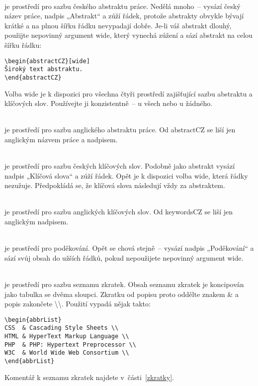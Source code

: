 \documentclass[fonts,numbering,twoside,margins]{./tulpackage/tulthesis}
\newcommand{\argument}[1]{{\ttfamily\color{\tulcolor}#1}}
\newcommand{\argumentindex}[1]{\argument{#1}\index{#1}}
\newcommand{\prostredi}[1]{\argumentindex{#1}}
\newenvironment{myquote}{\begin{list}{}{\setlength\leftmargin\parindent}\item[]}{\end{list}}
\newenvironment{listing}{\begin{myquote}\color{\tulcolor}}{\end{myquote}}
\newcommand{\polozka}[1]{\item[#1]\mbox{}\\}
\begin{document}
\begin{description}
\polozka{\prostredi{abstractCZ}} je prostředí pro sazbu českého abstraktu práce.
Nedělá mnoho~-- vysází český název práce, nadpis „Abstrakt“ a zúží řádek,
protože abstrakty obvykle bývají krátké a na plnou šířku řádku nevypadají
dobře. Je-li váš abstrakt dlouhý, použijte nepovinný argument \argument{wide},
který vynechá zúžení a sází abstrakt na celou šířku řádku:

\begin{listing}
\begin{verbatim}
\begin{abstractCZ}[wide]
Široký text abstraktu.
\end{abstractCZ}
\end{verbatim}
\end{listing}

Volba \argument{wide} je k dispozici pro všechna čtyři prostředí zajišťující
sazbu abstraktu a klíčových slov. Používejte ji konzistentně~-- u všech nebo u
žádného.

\polozka{\prostredi{abstractEN}} je prostředí pro sazbu anglického abstraktu práce.
Od \argument{abstractCZ} se liší jen anglickým názvem práce a nadpisem.

\polozka{\prostredi{keywordsCZ}} je prostředí pro sazbu českých klíčových slov.
Podobně jako abstrakt vysází nadpis „Klíčová slova“ a zúží řádek. Opět je k
dispozici volba \argument{wide}, která řádky nezužuje. Předpokládá se, že
klíčová slova následují vždy za abstraktem.

\polozka{\prostredi{keywordsEN}} je prostředí pro sazbu anglických klíčových slov.
Od \argument{keywordsCZ} se liší jen anglickým nadpisem.

\polozka{\prostredi{acknowledgement}} je prostředí pro poděkování. Opět se chová
stejně~-- vysází nadpis „Poděkování“ a sází svůj obsah do užších řádků, pokud
nepoužijete nepovinný argument \argument{wide}.

\polozka{\prostredi{abbrList}} je prostředí pro sazbu seznamu zkratek. Obsah
seznamu zkratek je koncipován jako tabulka se dvěma sloupci. Zkratku od popisu
proto oddělte znakem \argument{\&} a popis zakončete
\argument{\textbackslash\textbackslash}. Použití vypadá nějak takto:

{\color{\tulcolor}
\begin{verbatim}
\begin{abbrList}
CSS  & Cascading Style Sheets \\
HTML & HyperText Markup Language \\
PHP  & PHP: Hypertext Preprocessor \\
W3C  & World Wide Web Consortium \\
\end{abbrList}
\end{verbatim}}

Komentář k seznamu zkratek najdete v~části~\ref{zkratky}.

\end{description}
\end{document}

